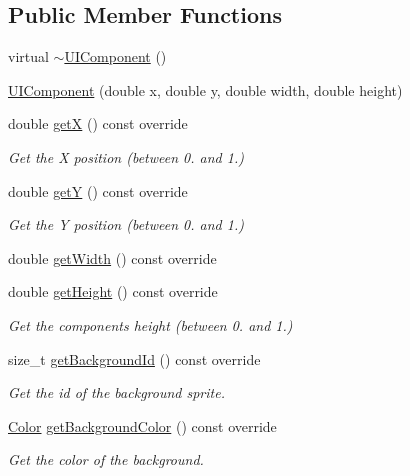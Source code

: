 \subsection*{Public Member Functions}
\begin{DoxyCompactItemize}
\item 
virtual \hyperlink{classarcade_1_1_u_i_component_ac2ca5956fe64bfbdc7b1fe2e97293396}{$\sim$\+U\+I\+Component} ()
\item 
\hyperlink{classarcade_1_1_u_i_component_aa5911db06c5159c74c99175180ac265d}{U\+I\+Component} (double x, double y, double width, double height)
\item 
double \hyperlink{classarcade_1_1_u_i_component_a8da01c706810692c7c3f0711c957fb15}{getX} () const override
\begin{DoxyCompactList}\small\item\em Get the X position (between 0. and 1.) \end{DoxyCompactList}\item 
double \hyperlink{classarcade_1_1_u_i_component_af5360eec3a1a473484df1df5f7d89ee9}{getY} () const override
\begin{DoxyCompactList}\small\item\em Get the Y position (between 0. and 1.) \end{DoxyCompactList}\item 
double \hyperlink{classarcade_1_1_u_i_component_a56c4ce3124813be5d456aec399c63bc9}{get\+Width} () const override
\item 
double \hyperlink{classarcade_1_1_u_i_component_abb02d0b9324eabf8ddf0d1302a0b08f7}{get\+Height} () const override
\begin{DoxyCompactList}\small\item\em Get the component\textquotesingle{}s height (between 0. and 1.) \end{DoxyCompactList}\item 
size\+\_\+t \hyperlink{classarcade_1_1_u_i_component_a7da87b1ce3bc56dcc6600e1c27e325a6}{get\+Background\+Id} () const override
\begin{DoxyCompactList}\small\item\em Get the id of the background sprite. \end{DoxyCompactList}\item 
\hyperlink{unionarcade_1_1_color}{Color} \hyperlink{classarcade_1_1_u_i_component_a981bbd394540b39ca0c7c0f760ef9551}{get\+Background\+Color} () const override
\begin{DoxyCompactList}\small\item\em Get the color of the background. \end{DoxyCompactList}\item 

\end{DoxyCompactItemize}
